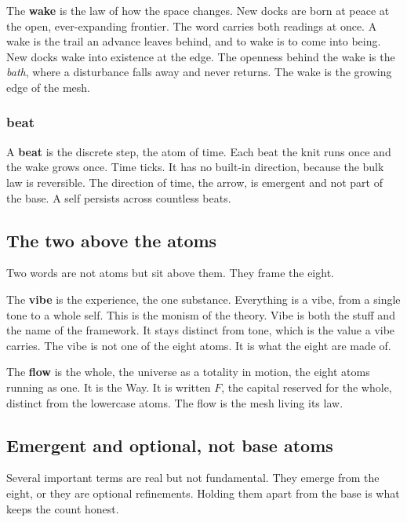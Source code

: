The \textbf{wake} is the law of how the space changes. New docks are born at peace at the open, ever-expanding frontier. The word carries both readings at once. A wake is the trail an advance leaves behind, and to wake is to come into being. New docks wake into existence at the edge. The openness behind the wake is the \emph{bath}, where a disturbance falls away and never returns. The wake is the growing edge of the mesh.

\subsubsection{beat}

A \textbf{beat} is the discrete step, the atom of time. Each beat the knit runs once and the wake grows once. Time ticks. It has no built-in direction, because the bulk law is reversible. The direction of time, the arrow, is emergent and not part of the base. A self persists across countless beats.

\subsection{The two above the atoms}

Two words are not atoms but sit above them. They frame the eight.

The \textbf{vibe} is the experience, the one substance. Everything is a vibe, from a single tone to a whole self. This is the monism of the theory. Vibe is both the stuff and the name of the framework. It stays distinct from tone, which is the value a vibe carries. The vibe is not one of the eight atoms. It is what the eight are made of.

The \textbf{flow} is the whole, the universe as a totality in motion, the eight atoms running as one. It is the Way. It is written $F$, the capital reserved for the whole, distinct from the lowercase atoms. The flow is the mesh living its law.

\subsection{Emergent and optional, not base atoms}

Several important terms are real but not fundamental. They emerge from the eight, or they are optional refinements. Holding them apart from the base is what keeps the count honest.

